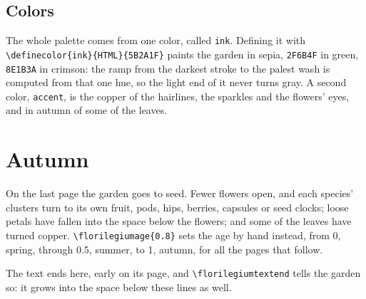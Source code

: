 \documentclass[11pt,a4paper]{article}
\newcommand\code[1]{\texttt{\small #1}}
\begin{document}
\subsection{Colors}

The whole palette comes from one color, called \code{ink}. Defining it with
\code{\textbackslash definecolor\{ink\}\{HTML\}\{5B2A1F\}} paints the garden in sepia, \code{2F6B4F} in green, \code{8E1B3A} in crimson: the ramp from
the darkest stroke to the palest wash is computed from that one hue, so the light end of
it never turns gray. A second color, \code{accent}, is the copper of the hairlines, the
sparkles and the flowers' eyes, and in autumn of some of the leaves.

\section{Autumn}

On the last page the garden goes to seed. Fewer flowers open, and each species' clusters
turn to its own fruit, pods, hips, berries, capsules or seed clocks; loose petals have fallen
into the space below the flowers; and some of the leaves have turned copper.
\code{\textbackslash florilegiumage\{0.8\}} sets the age by hand instead, from 0, spring,
through 0.5, summer, to 1, autumn, for all the pages that follow.

The text ends here, early on its page, and \code{\textbackslash florilegiumtextend} tells
the garden so: it grows into the space below these lines as well.
\florilegiumtextend
\end{document}
